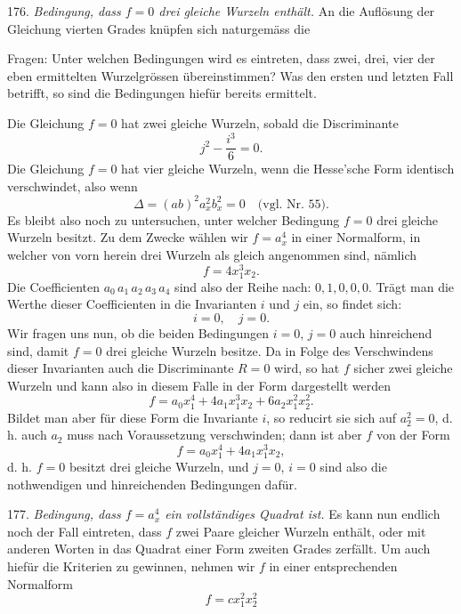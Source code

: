 176. \textit{Bedingung, dass $f=0$ drei gleiche Wurzeln enthält.} An die Auflösung der Gleichung vierten Grades knüpfen sich naturgemäss die


Fragen: Unter welchen Bedingungen wird es eintreten, dass zwei, drei, vier der eben ermittelten Wurzelgrössen übereinstimmen? Was den ersten und letzten Fall betrifft, so sind die Bedingungen hiefür bereits ermittelt.

Die Gleichung $f=0$ hat zwei gleiche Wurzeln, sobald die Discriminante
\[
j^2 - \frac{i^3}{6} = 0.
\]
Die Gleichung $f=0$ hat vier gleiche Wurzeln, wenn die Hesse'sche Form identisch verschwindet, also wenn
\[
\Delta = (ab)^2 a_x^2 b_x^2 = 0 \quad \text{(vgl. Nr. 55)}.
\]
Es bleibt also noch zu untersuchen, unter welcher Bedingung $f=0$ drei gleiche Wurzeln besitzt. Zu dem Zwecke wählen wir $f=a_x^4$ in einer Normalform, in welcher von vorn herein drei Wurzeln als gleich angenommen sind, nämlich
\[
f = 4x_1^3 x_2.
\]
Die Coefficienten $a_0\, a_1\, a_2\, a_3\, a_4$ sind also der Reihe nach: $0, 1, 0, 0, 0$. Trägt man die Werthe dieser Coefficienten in die Invarianten $i$ und $j$ ein, so findet sich:
\[
i = 0,\quad j = 0.
\]
Wir fragen uns nun, ob die beiden Bedingungen $i=0$, $j=0$ auch hinreichend sind, damit $f=0$ drei gleiche Wurzeln besitze. Da in Folge des Verschwindens dieser Invarianten auch die Discriminante $R=0$ wird, so hat $f$ sicher zwei gleiche Wurzeln und kann also in diesem Falle in der Form dargestellt werden
\[
f = a_0x_1^4 + 4a_1x_1^3x_2 + 6a_2x_1^2x_2^2.
\]
Bildet man aber für diese Form die Invariante $i$, so reducirt sie sich auf $a_2^2=0$, d. h. auch $a_2$ muss nach Voraussetzung verschwinden; dann ist aber $f$ von der Form
\[
f = a_0x_1^4 + 4a_1x_1^3x_2,
\]
d. h. $f=0$ besitzt drei gleiche Wurzeln, und $j=0$, $i=0$ sind also die nothwendigen und hinreichenden Bedingungen dafür.

177. \textit{Bedingung, dass $f=a_x^4$ ein vollständiges Quadrat ist.} Es kann nun endlich noch der Fall eintreten, dass $f$ zwei Paare gleicher Wurzeln enthält, oder mit anderen Worten in das Quadrat einer Form zweiten Grades zerfällt. Um auch hiefür die Kriterien zu gewinnen, nehmen wir $f$ in einer entsprechenden Normalform
\[
f = cx_1^2 x_2^2
\]


